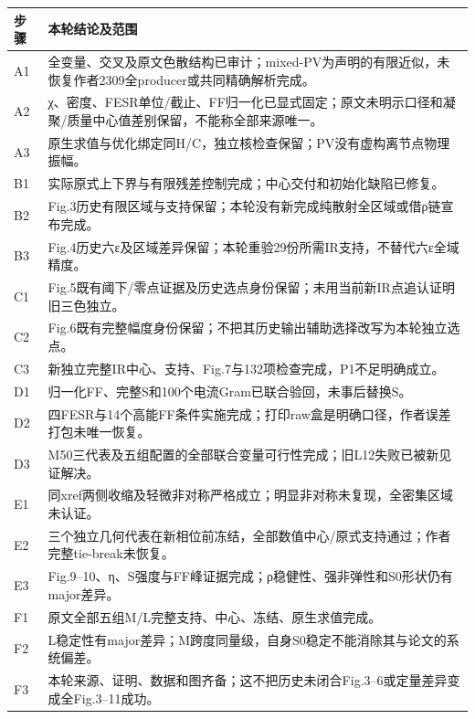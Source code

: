 \documentclass[
  10pt,
  a4paper,
]{article}
\newcounter{none} %
\begin{document}
{\def\LTcaptype{none} %
\begin{longtable}[]{@{}
  >{\raggedright\arraybackslash}p{}
  >{\raggedright\arraybackslash}p{}@{}}
\toprule\noalign{}
\begin{minipage}[b]{\linewidth}\raggedright
步骤
\end{minipage} & \begin{minipage}[b]{\linewidth}\raggedright
本轮结论及范围
\end{minipage} \\
\midrule\noalign{}
\endhead
\bottomrule\noalign{}
\endlastfoot
A1 &
全变量、交叉及原文色散结构已审计；mixed-PV为声明的有限近似，未恢复作者2309全producer或共同精确解析完成。 \\
A2 &
χ、密度、FESR单位/截止、FF归一化已显式固定；原文未明示口径和凝聚/质量中心值差别保留，不能称全部来源唯一。 \\
A3 &
原生求值与优化绑定同H/C，独立核检查保留；PV没有虚构离节点物理振幅。 \\
B1 & 实际原式上下界与有限残差控制完成；中心交付和初始化缺陷已修复。 \\
B2 &
Fig.3历史有限区域与支持保留；本轮没有新完成纯散射全区域或借ρ链宣布完成。 \\
B3 &
Fig.4历史六ε及区域差异保留；本轮重验29份所需IR支持，不替代六ε全域精度。 \\
C1 &
Fig.5既有阈下/零点证据及历史选点身份保留；未用当前新IR点追认证明旧三色独立。 \\
C2 &
Fig.6既有完整幅度身份保留；不把其历史输出辅助选择改写为本轮独立选点。 \\
C3 & 新独立完整IR中心、支持、Fig.7与132项检查完成，P1不足明确成立。 \\
D1 & 归一化FF、完整S和100个电流Gram已联合验回，未事后替换S。 \\
D2 &
四FESR与14个高能FF条件实施完成；打印raw盒是明确口径，作者误差打包未唯一恢复。 \\
D3 &
M50三代表及五组配置的全部联合变量可行性完成；旧L12失败已被新见证解决。 \\
E1 &
同xref两侧收缩及轻微非对称严格成立；明显非对称未复现，全密集区域未认证。 \\
E2 &
三个独立几何代表在新相位前冻结，全部数值中心/原式支持通过；作者完整tie-break未恢复。 \\
E3 &
Fig.9--10、η、S强度与FF峰证据完成；ρ稳健性、强非弹性和S0形状仍有major差异。 \\
F1 & 原文全部五组M/L完整支持、中心、冻结、原生求值完成。 \\
F2 &
L稳定性有major差异；M跨度同量级，自身S0稳定不能消除其与论文的系统偏差。 \\
F3 &
本轮来源、证明、数据和图齐备；这不把历史未闭合Fig.3--6或定量差异变成全Fig.3--11成功。 \\
\end{longtable}
}
\end{document}
